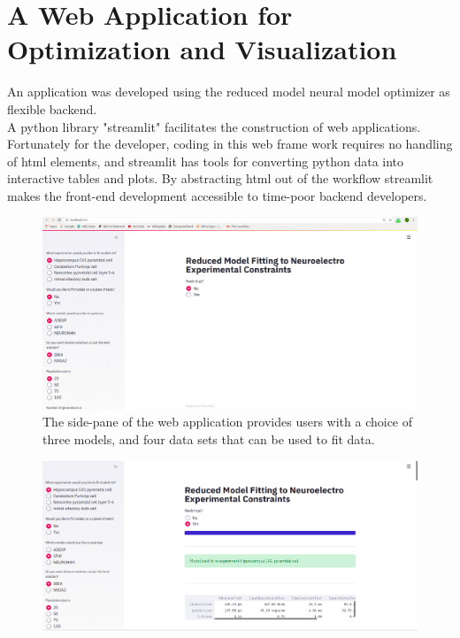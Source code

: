 \section{A Web Application for Optimization and Visualization}
An application was developed using the reduced model neural model optimizer as flexible backend. %
\\
A python library "streamlit" facilitates the construction of web applications. Fortunately for the developer, coding in this web frame work requires no handling of html elements, and streamlit has tools for converting python data into interactive tables and plots. By abstracting html out of the workflow streamlit makes the front-end development accessible to time-poor backend developers.\\
\begin{figure}
\begin{center}

\includegraphics[scale=1]{chapters/app_tex/web_app_thesis}
\caption{The side-pane of the web application provides users with a choice of three models, and four data sets that can be used to fit data.
}
\end{center}

\end{figure}
\begin{figure}
\begin{center}

\includegraphics[scale=1]{chapters/app_tex/app_results}
\end{center}

\end{figure}


